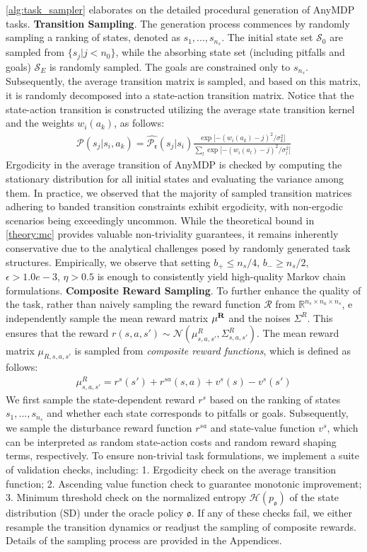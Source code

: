 \documentclass{article}
\begin{document}
\cref{alg:task_sampler} elaborates on the detailed procedural generation of AnyMDP tasks.
\textbf{Transition Sampling}. The generation process commences by randomly sampling a ranking of states, denoted as $s_1, ..., s_{n_s}$. The initial state set $\mathcal{S}_0$ are sampled from $\{s_j| j<n_0\}$, while the absorbing state set (including pitfalls and goals) $\mathcal{S}_E$ is randomly sampled. The goals are constrained only to $s_{n_s}$.
Subsequently, the average transition matrix is sampled, and based on this matrix, it is randomly decomposed into a state-action transition matrix. Notice that the state-action transition is constructed utilizing the average state transition kernel and the weights $w_i(a_k)$, as follows:
\begin{align}
    \mathcal{P}(s_j|s_i, a_k) = \hat{\mathcal{P}_{\mathfrak{r}}}(s_j|s_i)\frac{\exp{[-(w_i(a_k)-j)^2 / \sigma_k^2}]}{\sum_l \exp{[-(w_i(a_l)-j)^2 / \sigma_l^2}]} \label{eq:sample_sa_trans}
\end{align}
Ergodicity in the average transition of AnyMDP is checked by computing the stationary distribution for all initial states and evaluating the variance among them. In practice, we observed that the majority of sampled transition matrices adhering to banded transition constraints exhibit ergodicity, with non-ergodic scenarios being exceedingly uncommon.
While the theoretical bound in \cref{theory:mc} provides valuable non-triviality guarantees, it remains inherently conservative due to the analytical challenges posed by randomly generated task structures. Empirically, we observe that setting $b_+ \le n_s/4$, $b_- \ge n_s/2$, $\epsilon>1.0e-3$, $\eta>0.5$ is enough to consistently yield high-quality Markov chain formulations.
\textbf{Composite Reward Sampling}. To further enhance the quality of the task, rather than naively sampling the reward function $\mathcal{R}$ from $\mathbb{R}^{n_s\times n_a \times n_s}$, e independently sample the mean reward matrix $\bf{\mu}^R$ and the noises $\Sigma^R$. This ensures that the reward $r(s,a,s') \sim \mathcal{N}(\mu^R_{s,a,s'}, \Sigma^R_{s,a,s'})$. The mean reward matrix $\mu_{R,s,a,s'}$ is sampled from \emph{composite reward functions}, which is defined as follows:
\begin{align}
    \mu^R_{s,a,s'} = r^s(s') + r^{sa}(s,a) + v^s(s)-v^s(s') \label{eq:composite_rewards}
\end{align}
We first sample the state-dependent reward $r^s$ based on the ranking of states $s_1, ..., s_{n_s}$ and whether each state corresponds to pitfalls or goals. Subsequently, we sample the disturbance reward function $r^{sa}$ and state-value function $v^s$, which can be interpreted as random state-action costs and random reward shaping terms, respectively.
To ensure non-trivial task formulations, we implement a suite of validation checks, including: 1. Ergodicity check on the average transition function;
2. Ascending value function check to guarantee monotonic improvement;
3. Minimum threshold check on the normalized entropy  $\mathcal{H}(p_{\mathfrak{o}})$ of the state distribution (SD) under the oracle policy $\mathfrak{o}$.
If any of these checks fail, we either resample the transition dynamics or readjust the sampling of composite rewards. Details of the sampling process are provided in the Appendices.
\end{document}
